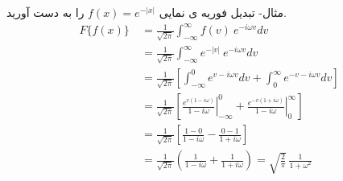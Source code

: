 مثال- تبدیل فوریه ی نمایی 
$f(x)=e^{-\left|x\right|}$
را به دست آورید.
\begin{equation*}
	\begin{aligned}
		F\{f(x)\} {} &\
		=\frac{1} {\sqrt{2\pi}}\int_{-{\infty}}^{{\infty}} f(v) \ e^{-i\omega v} d v
		\\ &\
		=\frac{1} {\sqrt{2\pi}}\int_{-{\infty}}^{{\infty}} e^{-|v|} \ e^{-i\omega v} d v
		\\ &\
		=\frac{1} {\sqrt{2\pi}}         \left[\int_{-{\infty}}^{0} e^{v-i\omega v} d v+\int_{0}^{{\infty}} e^{-v-i\omega v} d v\right]
		\\ &\
		=\frac{1} {\sqrt{2\pi}}      \left[\left.\frac{e^{v(1-i\omega)}}{1-i\omega}\right|_{-\infty}^{0} +\left.\frac{e^{-v(1+i\omega)}}{1-i\omega}\right|_{0}^{\infty} \right]
		\\ &\
		=\frac{1} {\sqrt{2\pi}}\left[\frac{1-0}{1-i\omega}-\frac{0-1}{1+i\omega}\right]
		\\ &\
		=\frac{1} {\sqrt{2\pi}}\left(\frac{1}{1-i\omega}+\frac{1}{1+i\omega}\right)
		=\sqrt{\frac{2}{\pi}}\, \frac{1}{1+\omega^2}
	\end{aligned}
\end{equation*}

